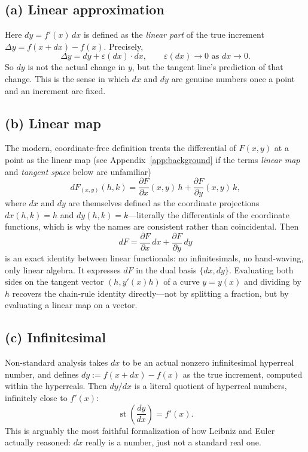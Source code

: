 \documentclass{essay}
\begin{document}
\subsection*{(a) Linear approximation}
Here \(dy = f'(x)\,dx\) is defined as the \emph{linear part} of the true increment \(\Delta y = f(x + dx) - f(x)\). Precisely,
\[ \Delta y = dy + \varepsilon(dx)\cdot dx, \qquad \varepsilon(dx) \to 0 \text{ as } dx \to 0. \]
So \(dy\) is not the actual change in \(y\), but the tangent line's prediction of that change. This is the sense in which \(dx\) and \(dy\) are genuine numbers once a point and an increment are fixed.

\subsection*{(b) Linear map}
The modern, coordinate-free definition treats the differential of \(F(x,y)\) at a point as the linear map (see Appendix~\ref{app:background} if the terms \emph{linear map} and \emph{tangent space} below are unfamiliar)
\[ dF_{(x,y)}(h,k) = \frac{\partial F}{\partial x}(x,y)\,h + \frac{\partial F}{\partial y}(x,y)\,k, \]
where \(dx\) and \(dy\) are themselves defined as the coordinate projections \(dx(h,k) = h\) and \(dy(h,k) = k\)---literally the differentials of the coordinate functions, which is why the names are consistent rather than coincidental. Then
\[ dF = \frac{\partial F}{\partial x}\,dx + \frac{\partial F}{\partial y}\,dy \]
is an exact identity between linear functionals: no infinitesimals, no hand-waving, only linear algebra. It expresses \(dF\) in the dual basis \(\{dx, dy\}\). Evaluating both sides on the tangent vector \((h, y'(x)h)\) of a curve \(y = y(x)\) and dividing by \(h\) recovers the chain-rule identity directly---not by splitting a fraction, but by evaluating a linear map on a vector.

\subsection*{(c) Infinitesimal}
Non-standard analysis takes \(dx\) to be an actual nonzero infinitesimal hyperreal number, and defines \(dy := f(x + dx) - f(x)\) as the true increment, computed within the hyperreals. Then \(dy/dx\) is a literal quotient of hyperreal numbers, infinitely close to \(f'(x)\):
\[ \operatorname{st}\!\left(\frac{dy}{dx}\right) = f'(x). \]
This is arguably the most faithful formalization of how Leibniz and Euler actually reasoned: \(dx\) really is a number, just not a standard real one.
\end{document}
